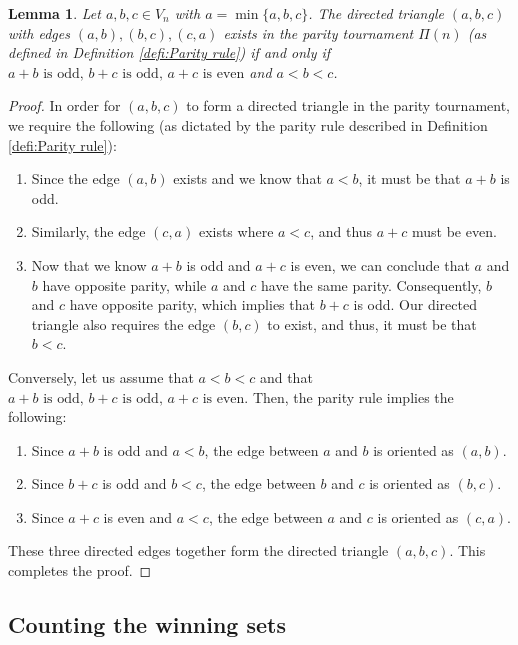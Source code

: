 \documentclass{article}
\theoremstyle{definition}
\theoremstyle{plain}
\newtheorem{lem}[theo]{Lemma}
\theoremstyle{remark}
\theoremstyle{definition}
\begin{document}
\begin{lem}\label{lem:triangle_structure}
Let $a,b,c \in V_n$ with $a = \min\{a,b,c\}$. The directed triangle $(a,b,c)$ with edges $(a,b),(b,c),(c,a)$ exists in the parity tournament $\Pi(n)$ (as defined in Definition \ref{defi:Parity rule}) if and only if $a+b \text{ is odd},\, b+c \text{ is odd},\, a+c \text{ is even}$ and $a < b < c$.

\end{lem}

\begin{proof}
In order for $(a,b,c)$ to form a directed triangle in the parity tournament, we require the following (as dictated by the parity rule described in Definition \ref{defi:Parity rule}):
\begin{enumerate}
    \item Since the edge $(a,b)$ exists and we know that $a<b$, it must be that $a+b$ is odd.
    \item Similarly, the edge $(c,a)$ exists where $a<c$, and thus $a+c$ must be even.
    \item Now that we know $a + b$ is odd and $a + c$ is even, we can conclude that $a$ and $b$ have opposite parity, while $a$ and $c$ have the same parity. Consequently, $b$ and $c$ have opposite parity, which implies that $b+c$ is odd. Our directed triangle also requires the edge $(b,c)$ to exist, and thus, it must be that $b<c$.
\end{enumerate}
Conversely, let us assume that $a<b<c$ and that $a+b \text{ is odd},\, b+c \text{ is odd},\, a+c \text{ is even}.$
Then, the parity rule implies the following:
\begin{enumerate}
    \item Since $a+b$ is odd and $a<b$, the edge between $a$ and $b$ is oriented as $(a,b)$.
    \item Since $b+c$ is odd and $b<c$, the edge between $b$ and $c$ is oriented as $(b,c)$.
    \item Since $a+c$ is even and $a<c$, the edge between $a$ and $c$ is oriented as $(c,a)$.
\end{enumerate}
These three directed edges together form the directed triangle $(a,b,c).$ This completes the proof.
\end{proof}

\subsection{Counting the winning sets} \label{subsec: count of winning sets}
\end{document}
